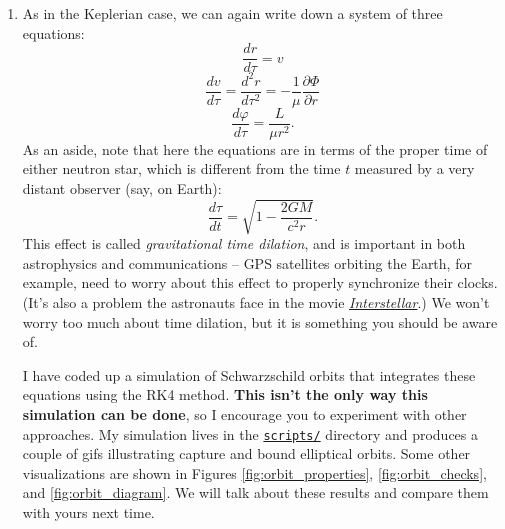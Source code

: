 \documentclass[11pt]{article}
\begin{document}
\begin{enumerate}
\item As in the Keplerian case, we can again write down a system of three equations:
\[ \frac{dr}{d\tau} = v \]
\[ \frac{dv}{d\tau} = \frac{d^2 r}{d\tau^2} = -\frac{1}{\mu}\frac{\partial\Phi}{\partial r} \]
\[ \frac{d\varphi}{d\tau} = \frac{L}{\mu r^2}. \]
As an aside, note that here the equations are in terms of the proper time of either neutron star, which is different from the time $t$ measured by a very distant observer (say, on Earth):
\[ \frac{d\tau}{dt} = \sqrt{1 - \frac{2GM}{c^2 r}}. \]
This effect is called \textit{gravitational time dilation}, and is important in both astrophysics and communications -- GPS satellites orbiting the Earth, for example, need to worry about this effect to properly synchronize their clocks. (It's also a problem the astronauts face in the movie \href{https://youtu.be/nOipaf5Rt9o}{\textit{Interstellar}}.) We won't worry too much about time dilation, but it is something you should be aware of.

\hspace{15pt} I have coded up a simulation of Schwarzschild orbits that integrates these equations using the RK4 method. \textbf{This isn't the only way this simulation can be done}, so I encourage you to experiment with other approaches. My simulation lives in the \href{https://github.com/alurban/mentoring/blob/master/tidal_disruption/scripts/schwarzschild_orbits_rk4.py}{\texttt{scripts/}} directory and produces a couple of gifs illustrating capture and bound elliptical orbits. Some other visualizations are shown in Figures \ref{fig:orbit_properties}, \ref{fig:orbit_checks}, and \ref{fig:orbit_diagram}. We will talk about these results and compare them with yours next time.


\end{enumerate}
\end{document}
